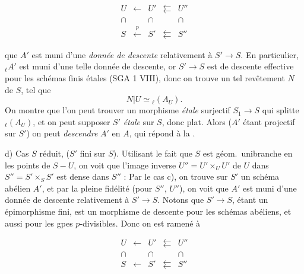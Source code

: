 \documentclass[11pt,a4paper]{article}
\begin{document}
\[
  \begin{array}{ccccc}
    U & \longleftarrow & U' & \leftleftarrows & U'' \\
    \cap & & \cap & & \cap \\
    S & \xleftarrow{\ p\ } & S' & \leftleftarrows & S''
  \end{array}
\]



que $A'$ est muni d'une \emph{donnée de descente} relativement à
$S' \to S$. En particulier,  ${}_{\ell}A'$ est muni d'une
telle donnée de descente,  or $S' \to S$ est
 de descente effective pour les schémas
 finis étales (SGA 1 VIII), donc on trouve un
 tel revêtement   $N$ de $S$,
tel que
\[
  N|U \simeq {}_{\ell}(A_U).
\]
On montre que l'on peut trouver un morphisme 
\emph{étale} surjectif $S_1 \to S$ qui splitte ${}_{\ell}(A_U)$,
 et on peut supposer $S'$ 
\emph{étale} sur $S$, donc plat. Alors ($A'$ étant projectif sur $S'$) on
\struck{\ill{}} \struck{\ill{}} peut \emph{descendre} $A'$ en $A$, qui
répond à la .

d) Cas $S$ réduit, ($S'$ fini sur $S$). Utilisant le fait que $S$ est
géom.\ unibranche en les points de $S - U$, on voit que l'image inverse
$U'' = U' \times_U U'$ de $U$ dans $S'' = S' \times_S S'$ est
dense dans $S''$ :  Par le cas c), on
trouve sur $S'$ un schéma abélien $A'$, et par la pleine fidélité (pour
$S''$, $U''$), on voit que $A'$ est muni d'une donnée de descente
relativement à $S' \to S$. Notons que $S' \to S$,
étant un épimorphisme fini, est un morphisme
de descente pour les schémas abéliens,  et
aussi pour les gpes $p$-divisibles. Donc on est ramené à

\[
  \begin{array}{ccccc}
    U & \longleftarrow & U' & \leftleftarrows & U'' \\
    \cap & & \cap & & \cap \\
    S & \longleftarrow & S' & \leftleftarrows & S''
  \end{array}
\]
\end{document}
